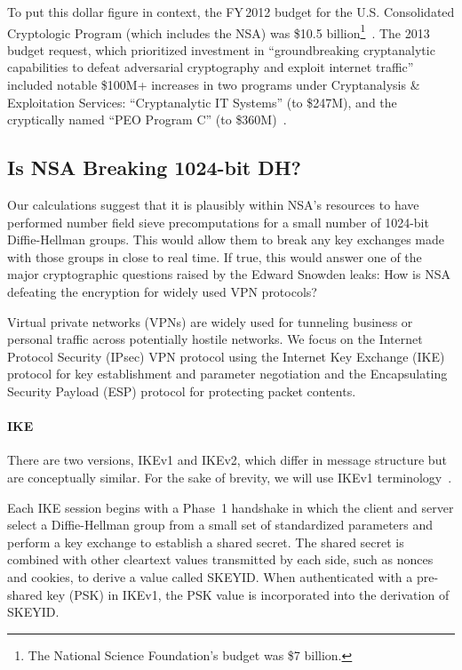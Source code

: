 To put this dollar figure in context, the FY\,2012 budget for the
U.S. Consolidated Cryptologic Program (which includes the NSA)
was \$10.5 billion\footnote{\small The National Science Foundation's budget
was \$7 billion.}~\cite{blackBudget:full}.  The 2013 budget request, which prioritized investment in ``groundbreaking
cryptanalytic capabilities to defeat adversarial cryptography and
exploit internet traffic'' included notable \$100M+ increases in two
programs under Cryptanalysis \& Exploitation Services: ``Cryptanalytic IT Systems''
(to \$247M), and the cryptically named ``PEO Program C'' (to \$360M)~\cite{blackBudget:full}.

\subsection{Is NSA Breaking 1024-bit DH?}

Our calculations suggest that it is plausibly within NSA's resources
to have performed number field sieve precomputations for a
small number of 1024-bit Diffie-Hellman groups.  This would allow them
to break any key exchanges made with those groups in close to real
time.  If true, this would answer one of the major cryptographic
questions raised by the Edward Snowden leaks: How is NSA defeating the
encryption for widely used VPN protocols?

Virtual private networks (VPNs) are widely used for tunneling business
or personal traffic across potentially hostile networks. We focus on the
Internet Protocol Security (IPsec) VPN protocol using the Internet Key
Exchange (IKE) protocol for key establishment and parameter negotiation and the
Encapsulating Security Payload (ESP) protocol for protecting packet contents.

\paragraph{IKE}
There are two versions, IKEv1 and
IKEv2, which differ in message structure but are
conceptually similar. For the sake of brevity, we will use IKEv1
terminology~\cite{rfc7296}.

\newcommand{\skeyid}{\textsf{\small SKEYID}}
\newcommand{\keymat}{\textsf{\small KEYMAT}}
\newcommand{\psk}{\textsf{\small PSK}}

Each IKE session begins with a Phase~1 handshake in which the client
and server select a Diffie-Hellman group from a small set of
standardized parameters and perform a key exchange to establish a
shared secret.  The shared secret is combined with other cleartext values
 transmitted by each side, such as nonces and cookies, to derive
a value called \skeyid\@.  When authenticated with a pre-shared key (PSK) in IKEv1, the PSK value is incorporated into the derivation of \skeyid.


